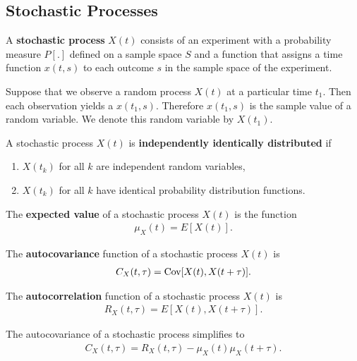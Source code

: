 \documentclass{memoir}
\begin{document}
\subsection{Stochastic Processes}

\begin{definition}
    A \textbf{stochastic process} $X(t)$ consists of an experiment with a probability measure $P[.]$ defined on a sample space $S$ and a function that assigns a time function $x(t,s)$ to each outcome $s$ in the sample space of the experiment.
\end{definition}

Suppose that we observe a random process $X(t)$ at a particular time $t_1$. Then each observation yields a $x(t_1,s)$. Therefore $x(t_1,s)$ is the sample value of a random variable. We denote this random variable by $X(t_1)$.

\begin{definition}
    A stochastic process $X(t)$ is \textbf{independently identically distributed} if
    \begin{enumerate}
        \item $X(t_k)$ for all $k$ are independent random variables,
        \item $X(t_k)$ for all $k$ have identical probability distribution functions.
    \end{enumerate}
\end{definition}

\begin{definition}
    The \textbf{expected value} of a stochastic process $X(t)$ is the function
    \begin{align*}
        \mu_X(t) = E[X(t)].
    \end{align*}
\end{definition}

\begin{definition}
    The \textbf{autocovariance} function of a stochastic process $X(t)$ is
    \begin{align*}
        C_X(t,\tau)=\operatorname{Cov}[X(t),X(t+\tau)].
    \end{align*}
\end{definition}

\begin{definition}
    The \textbf{autocorrelation} function of a stochastic process $X(t)$ is
    \begin{align*}
        R_X(t,\tau)=E[X(t),X(t + \tau)].
    \end{align*}
\end{definition}
The autocovariance of a stochastic process simplifies to
\begin{align*}
    C_X(t,\tau) = R_X(t,\tau) - \mu_X(t) \mu_X(t + \tau).
\end{align*}
\end{document}
